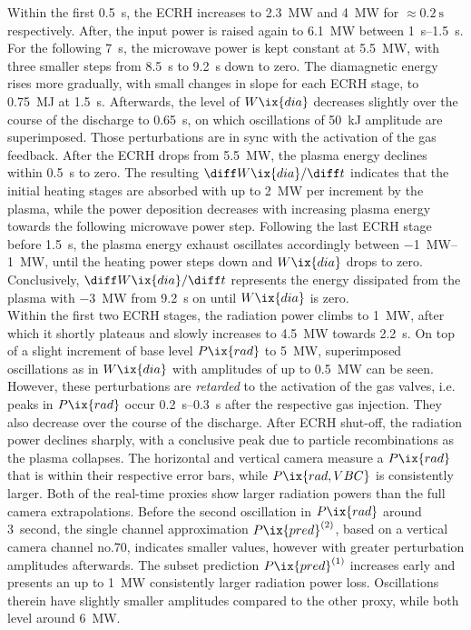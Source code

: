%
            Within the first \SI{0.5}{\second}, the ECRH increases to \SI{2.3}{\mega\watt} and \SI{4}{\mega\watt} for $\approx\SI{0.2}{\second}$ respectively. After, the input power is raised again to \SI{6.1}{\mega\watt} between \SIrange{1}{1.5}{\second}. For the following \SI{7}{\second}, the microwave power is kept constant at \SI{5.5}{\mega\watt}, with three smaller steps from \SI{8.5}{\second} to \SI{9.2}{\second} down to zero. The diamagnetic energy rises more gradually, with small changes in slope for each ECRH stage, to \SI{0.75}{\mega\joule} at \SI{1.5}{\second}. Afterwards, the level of $W\ix{dia}$ decreases slightly over the course of the discharge to \SI{0.65}{\second}, on which oscillations of \SI{50}{\kilo\joule} amplitude are superimposed. Those perturbations are in sync with the activation of the gas feedback. After the ECRH drops from \SI{5.5}{\mega\watt}, the plasma energy declines within \SI{0.5}{\second} to zero. The resulting $\diff W\ix{dia}/\diff t$ indicates that the initial heating stages are absorbed with up to \SI{2}{\mega\watt} per increment by the plasma, while the power deposition decreases with increasing plasma energy towards the following microwave power step. Following the last ECRH stage before \SI{1.5}{\second}, the plasma energy exhaust oscillates accordingly between \SIrange{-1}{1}{\mega\watt}, until the heating power steps down and $W\ix{dia}$ drops to zero. Conclusively, $\diff W\ix{dia}/\diff t$ represents the energy dissipated from the plasma with \SI{-3}{\mega\watt} from \SI{9.2}{\second} on until $W\ix{dia}$ is zero.\\%
            Within the first two ECRH stages, the radiation power climbs to \SI{1}{\mega\watt}, after which it shortly plateaus and slowly increases to \SI{4.5}{\mega\watt} towards \SI{2.2}{\second}. On top of a slight increment of base level $P\ix{rad}$ to \SI{5}{\mega\watt}, superimposed oscillations as in $W\ix{dia}$ with amplitudes of up to \SI{0.5}{\mega\watt} can be seen. However, these perturbations are \textit{retarded} to the activation of the gas valves, i.e. peaks in $P\ix{rad}$ occur \SIrange{0.2}{0.3}{\second} after the respective gas injection. They also decrease over the course of the discharge. After ECRH shut-off, the radiation power declines sharply, with a conclusive peak due to particle recombinations as the plasma collapses. The horizontal and vertical camera measure a $P\ix{rad}$ that is within their respective error bars, while $P\ix{rad, VBC}$ is consistently larger. Both of the real-time proxies show larger radiation powers than the full camera extrapolations. Before the second oscillation in $P\ix{rad}$ around \SI{3}{second}, the single channel approximation $P\ix{pred}^{\left(2\right)}$, based on a vertical camera channel no.70, indicates smaller values, however with greater perturbation amplitudes afterwards. The subset prediction $P\ix{pred}^{\left(1\right)}$ increases early and presents an up to \SI{1}{\mega\watt} consistently larger radiation power loss. Oscillations therein have slightly smaller amplitudes compared to the other proxy, while both level around \SI{6}{\mega\watt}.\\%
